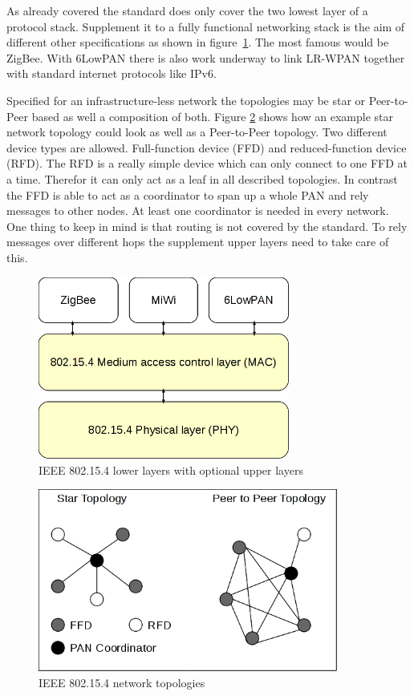 As already covered the standard does only cover the two lowest layer of a
protocol stack. Supplement it to a fully functional networking stack is the aim
of different other specifications as shown in figure~\ref{fig:802154layer}. The
most famous would be ZigBee. With 6LowPAN there is also work underway to link
LR-WPAN together with standard internet protocols like IPv6.

Specified for an infrastructure-less network the topologies may be star or
Peer-to-Peer based as well a composition of both. Figure \ref{fig:802154topologies}
shows how an example star network topology could look as well as a Peer-to-Peer
topology. Two different device types are allowed. Full-function device (FFD) and
reduced-function device (RFD). The RFD is a really simple device which can only
connect to one FFD at a time. Therefor it can only act as a leaf in all
described topologies. In contrast the FFD is able to act as a coordinator to
span up a whole PAN and rely messages to other nodes. At least one coordinator
is needed in every network. One thing to keep in mind is that routing is not
covered by the standard. To rely messages over different hops the supplement
upper layers need to take care of this.

\begin{figure}
  \begin{center}
    \includegraphics[height=6cm]{images/802154layer}
    \caption{IEEE 802.15.4 lower layers with optional upper layers}
        \label{fig:802154layer}
  \end{center}
\end{figure}

\begin{figure}
  \begin{center}
    \includegraphics[height=6cm]{images/802154topology}
    \caption{IEEE 802.15.4 network topologies}
        \label{fig:802154topologies}
  \end{center}
\end{figure}

